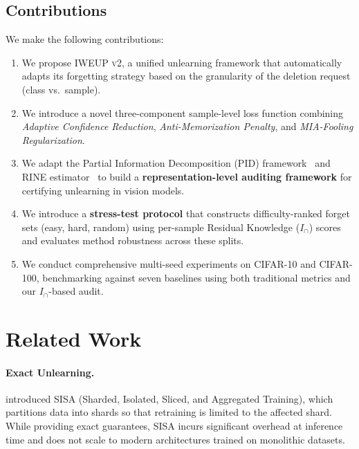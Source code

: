 \documentclass[11pt]{article}
\newcommand{\method}{\textsc{IWEUP v2}}
\begin{document}
\subsection{Contributions}
We make the following contributions:
\begin{enumerate}[leftmargin=*]
    \item We propose \method{}, a unified unlearning framework that automatically adapts its forgetting strategy based on the granularity of the deletion request (class vs.\ sample).
    \item We introduce a novel three-component sample-level loss function combining \textit{Adaptive Confidence Reduction}, \textit{Anti-Memorization Penalty}, and \textit{MIA-Fooling Regularization}.
    \item We adapt the Partial Information Decomposition (PID) framework~\citep{gutknecht2021bits} and RINE estimator~\citep{mazzetto2025auditing} to build a \textbf{representation-level auditing framework} for certifying unlearning in vision models.
    \item We introduce a \textbf{stress-test protocol} that constructs difficulty-ranked forget sets (easy, hard, random) using per-sample Residual Knowledge ($I_\cap$) scores and evaluates method robustness across these splits.
    \item We conduct comprehensive multi-seed experiments on CIFAR-10 and CIFAR-100, benchmarking against seven baselines using both traditional metrics and our $I_\cap$-based audit.
\end{enumerate}

\section{Related Work}
\label{sec:related}

\paragraph{Exact Unlearning.}
\citet{bourtoule2021machine} introduced SISA (Sharded, Isolated, Sliced, and Aggregated Training), which partitions data into shards so that retraining is limited to the affected shard. While providing exact guarantees, SISA incurs significant overhead at inference time and does not scale to modern architectures trained on monolithic datasets.
\end{document}
